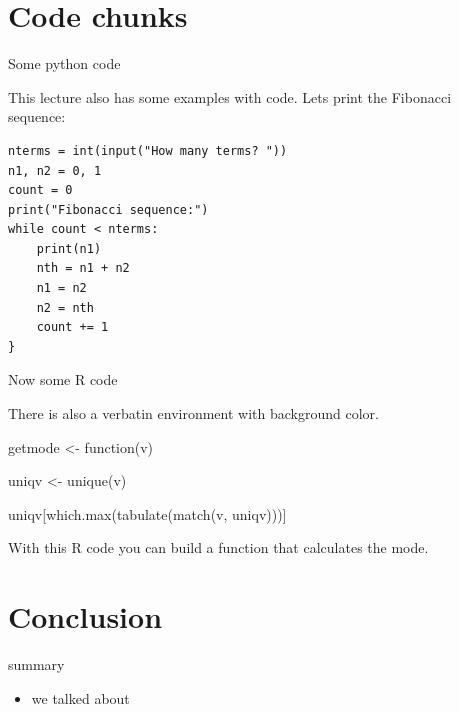 \section{Code chunks}


\begin{frame}[fragile]{Some python code}

This lecture also has some examples with code. Lets print the Fibonacci sequence:

\begin{verbatim}
nterms = int(input("How many terms? "))
n1, n2 = 0, 1
count = 0
print("Fibonacci sequence:")
while count < nterms:
    print(n1)
    nth = n1 + n2
    n1 = n2
    n2 = nth
    count += 1
}
\end{verbatim}

\end{frame}


\begin{frame}[fragile]{Now some R code}

There is also a verbatin environment with background color.

\begin{cverbatim}
getmode <- function(v) {
  
  uniqv <- unique(v)
  
  uniqv[which.max(tabulate(match(v, uniqv)))]
  
}
\end{cverbatim}

With this R code you can build a function that calculates the mode.


\end{frame}

\section{Conclusion}


\begin{frame}{summary}
\begin{itemize}

\item we talked about

\end{itemize}
\end{frame}



















